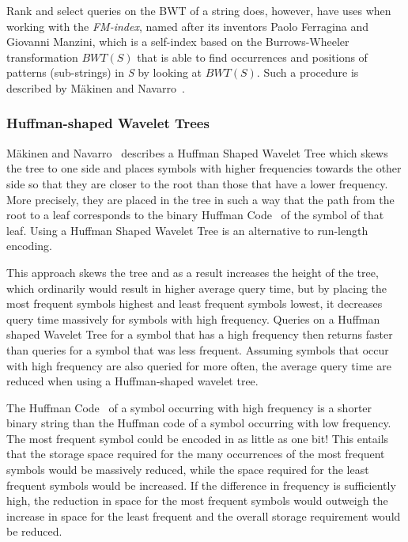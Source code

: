 Rank and select queries on the BWT of a string does, however, have uses when working with the \textit{FM-index}, named after its inventors Paolo Ferragina and Giovanni Manzini, which is a self-index based on the Burrows-Wheeler transformation $BWT(S)$ that is able to find occurrences and positions of patterns (sub-strings) in \textit{S} by looking at $BWT(S)$. 
Such a procedure is described by Mäkinen and Navarro~.

\subsubsection{Huffman-shaped Wavelet Trees}
\label{sec:huffmanShapedWaveletTree}
Mäkinen and Navarro~ describes a Huffman Shaped Wavelet Tree which skews the tree to one side and places symbols with higher frequencies towards the other side so that they are closer to the root than those that have a lower frequency.
More precisely, they are placed in the tree in such a way that the path from the root to a leaf corresponds to the binary Huffman Code~ of the symbol of that leaf.
Using a Huffman Shaped Wavelet Tree is an alternative to run-length encoding.

This approach skews the tree and as a result increases the height of the tree, which ordinarily would result in higher average query time, but by placing the most frequent symbols highest and least frequent symbols lowest, it decreases query time massively for symbols with high frequency.
Queries on a Huffman shaped Wavelet Tree for a symbol that has a high frequency then returns faster than queries for a symbol that was less frequent.
Assuming symbols that occur with high frequency are also queried for more often, the average query time are reduced when using a Huffman-shaped wavelet tree.

The Huffman Code~ of a symbol occurring with high frequency is a shorter binary string than the Huffman code of a symbol occurring with low frequency.
The most frequent symbol could be encoded in as little as one bit!
This entails that the storage space required for the many occurrences of the most frequent symbols would be massively reduced, while the space required for the least frequent symbols would be increased.
If the difference in frequency is sufficiently high, the reduction in space for the most frequent symbols would outweigh the increase in space for the least frequent and the overall storage requirement would be reduced.

